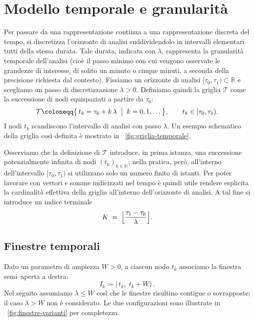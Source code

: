 \section{Modello temporale e granularità}
\label{sec:modello-temporale}
Per passare da una rappresentazione continua a una rappresentazione discreta del tempo, si discretizza l’orizzonte di analisi suddividendolo in intervalli elementari tutti della stessa durata. Tale durata, indicata con \(\lambda\), rappresenta la granularità temporale dell’analisi (cioè il passo minimo con cui vengono osservate le grandezze di interesse, di solito un minuto o cinque minuti, a seconda della precisione richiesta dal contesto).
Fissiamo un orizzonte di analisi \([\tau_0,\tau_1)\subset\mathbb{R}\) e scegliamo un passo di discretizzazione \(\lambda>0\). Definiamo quindi la griglia \(\mathcal{T}\) come la successione di nodi equispaziati a partire da \(\tau_0\):
\begin{equation*}
\label{eq:griglia-def}
\mathcal{T}\coloneqq \bigl\{\, t_k = \tau_0 + k\,\lambda \;\bigm|\; k=0,1,\dots \,\bigr\}, \qquad t_k \in [\tau_0,\tau_1) .
\end{equation*}
I nodi \(t_k\) scandiscono l’intervallo di analisi con passo \(\lambda\).
Un esempio schematico della griglia così definita è mostrato in \figurename~\ref{fig:griglia-temporale}.


Osserviamo che la definizione di \(\mathcal{T}\) introduce, in prima istanza, una successione potenzialmente infinita di nodi \((t_k)_{k\in\mathbb{N}}\); nella pratica, però, all’interno dell’intervallo \([\tau_0,\tau_1)\) si utilizzano solo un numero finito di istanti. Per poter lavorare con vettori e somme indicizzati nel tempo è quindi utile rendere esplicita la cardinalità effettiva della griglia all’interno dell’orizzonte di analisi. A tal fine si introduce un indice terminale
\begin{equation}
\label{eq:define-K}
K \;=\; \Bigl\lfloor \frac{\tau_1 - \tau_0}{\lambda} \Bigr\rfloor .
\end{equation}
\subsection{Finestre temporali}\label{sec:finestre_temporali}
Dato un parametro di ampiezza \(W>0\), a ciascun nodo \(t_k\) associamo la finestra semi–aperta a destra:
\begin{equation*}
\label{eq:finestra-def}
I_k \coloneqq [\,t_k,\; t_k+W)\,.
\end{equation*}
Nel seguito assumiamo \(\lambda \le W\) così che le finestre risultino contigue o sovrapposte; il caso \(\lambda>W\) non è considerato. Le due configurazioni sono illustrate in \figurename~\ref{fig:finestre-varianti} per completezza.
\clearpage


